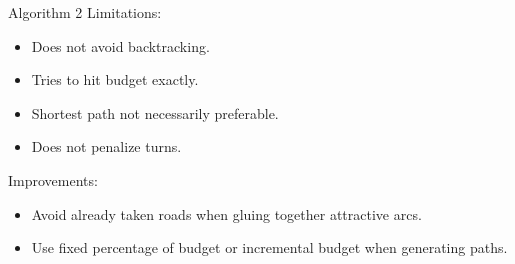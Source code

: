 \documentclass{beamer}
\begin{document}
\begin{frame}{Algorithm 2 \cite{lu2015arc}}
    Limitations:
    \begin{itemize}
        \item Does not avoid backtracking.
        \item Tries to hit budget exactly.
        \item Shortest path not necessarily preferable.
        \item Does not penalize turns. 
    \end{itemize}
    
    Improvements:
    \begin{itemize}
        \item Avoid already taken roads when gluing together attractive arcs.
        \item Use fixed percentage of budget or incremental budget when generating paths.
    \end{itemize}
    
\end{frame}
\end{document}
